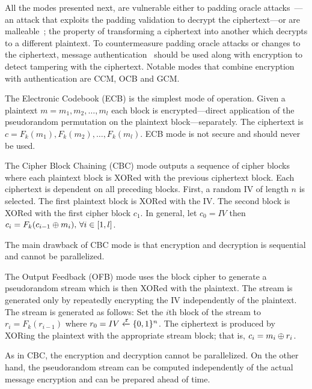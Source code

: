 All the modes presented next, are vulnerable either to padding oracle attacks~\cite{padding_attacks}---an attack that exploits the padding validation to decrypt the ciphertext---or are malleable~\cite{malleability}; the property of transforming a ciphertext into another which decrypts to a different plaintext. To countermeasure padding oracle attacks or changes to the ciphertext, message authentication~\cite{Katz:2014:IMC:2700550} should be used along with encryption to detect tampering with the ciphertext. Notable modes that combine encryption with authentication are CCM, OCB and GCM.

\label{preliminaries:sym:modes:ecb}

The Electronic Codebook (ECB) is the simplest mode of operation. Given a plaintext $m = m_1, m_2, \dots, m_l$ each block is encrypted---direct application of the pseudorandom permutation on the plaintext block---separately. The ciphertext is $c = F_k(m_1), F_k(m_2), \dots, F_k(m_l)$. ECB mode is not secure and should never be used.

\label{preliminaries:sym:modes:cbc}

The Cipher Block Chaining (CBC) mode outputs a sequence of cipher blocks where each plaintext block is XORed with the previous ciphertext block. Each ciphertext is dependent on all preceding blocks. First, a random IV of length $n$ is selected. The first plaintext block is XORed with the IV. The second block is XORed with the first cipher block $c_1$. In general, let $c_0 = IV$ then $c_i = F_k(c_{i-1} \oplus m_i) \mbox{, } \forall i \in [1, l]$.

The main drawback of CBC mode is that encryption and decryption is sequential and cannot be parallelized.

\label{preliminaries:sym:modes:ofb}

The Output Feedback (OFB) mode uses the block cipher to generate a pseudorandom stream which is then XORed with the plaintext. The stream is generated only by repeatedly encrypting the IV independently of the plaintext. The stream is generated as follows: Set the $i$th block of the stream to $r_i = F_k(r_{i-1})$ where $r_0 = IV \xleftarrow{\mathtt{r}}{\{ 0, 1 \}^{n}}$. The ciphertext is produced by XORing the plaintext with the appropriate stream block; that is, $c_i = m_i \oplus r_i$.

As in CBC, the encryption and decryption cannot be parallelized. On the other hand, the pseudorandom stream can be computed independently of the actual message encryption and can be prepared ahead of time.

